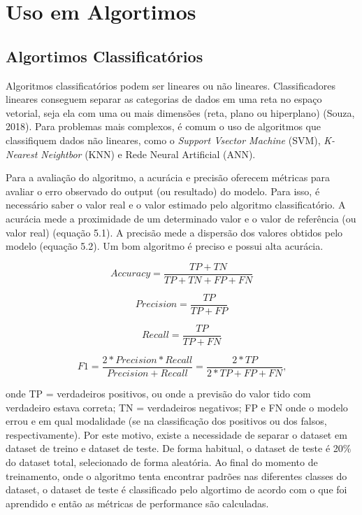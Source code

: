 \chapter{Uso em Algortimos}

\section{Algortimos Classificatórios}
% 

Algoritmos classificatórios
podem ser lineares ou não lineares. 
Classificadores lineares conseguem separar 
as categorias de dados em uma reta no espaço vetorial, seja ela com uma ou mais dimensões (reta, plano ou hiperplano) (Souza, 2018). Para problemas mais complexos,
é comum o uso de algoritmos que classifiquem dados não lineares, como o \textit{Support Vsector Machine} (SVM), 
\textit{K-Nearest Neightbor} (KNN) e
Rede Neural Artificial (ANN).

Para a avaliação do algoritmo, a acurácia e precisão oferecem métricas para avaliar o erro observado do output (ou resultado) do modelo. 
Para isso, é necessário saber o valor real e o valor estimado pelo algoritmo classificatório. 
A acurácia mede a proximidade de um determinado valor e o valor de referência (ou valor real) (equação 5.1). 
A precisão mede a dispersão dos valores obtidos pelo modelo (equação 5.2). Um bom algoritmo é preciso e possui alta acurácia. 

\begin{equation}
      Accuracy = \frac{TP+TN}{TP+TN+FP+FN}
\end{equation}

\begin{equation}
      Precision = \frac{TP}{TP+FP}
\end{equation}

\begin{equation}
      Recall = \frac{TP}{TP+FN}
\end{equation}

\begin{equation}
      F1 = \frac{2*Precision*Recall}{Precision+Recall} = \frac{2*TP}{2*TP+FP+FN}\text{,}
\end{equation}

onde TP = verdadeiros positivos, ou onde a previsão do valor tido com verdadeiro estava correta; TN = verdadeiros negativos;
FP e FN onde o modelo errou e em qual modalidade (se na classificação dos positivos ou dos falsos, respectivamente).
Por este motivo, existe a necessidade de separar o dataset em dataset de treino e dataset de teste. De forma habitual, o dataset
de teste é 20\% do dataset total, selecionado de forma aleatória. Ao final do momento de treinamento, onde o algoritmo 
tenta encontrar padrões nas diferentes classes do dataset, o dataset de teste é classificado pelo algortimo de acordo 
com o que foi aprendido e então as métricas de performance são calculadas. 


